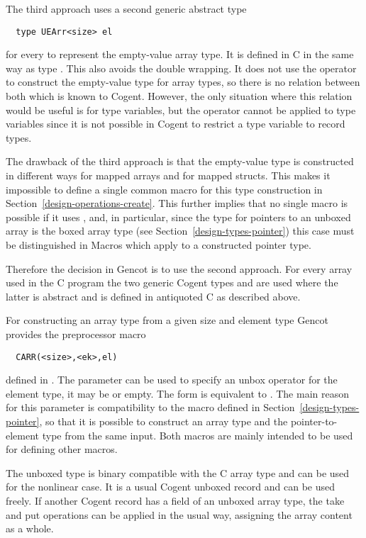 The third approach uses a second generic abstract type 
\begin{verbatim}
  type UEArr<size> el
\end{verbatim}
for every  to represent the empty-value array type. It is defined in C in the same way as type .
This also avoids the double wrapping. It does not use the  operator to construct the empty-value type
for array types, so there is no relation between both which is known to Cogent. However, the only situation where this
relation would be useful is for type variables, but the  operator cannot be applied to type variables since
it is not possible in Cogent to restrict a type variable to record types. 

The drawback of the third approach is that the empty-value 
type is constructed in different ways for mapped arrays and for mapped structs. This makes it impossible to define 
a single common macro  for this type construction in Section~\ref{design-operations-create}. This further 
implies that no single macro is possible if it uses , and, in particular, since the type for pointers to
an unboxed array is the boxed array type (see Section~\ref{design-types-pointer}) this case must be distinguished 
in Macros which apply  to a constructed pointer type.

Therefore the decision in Gencot is to use the second approach. For every array  used in the C 
program the two generic Cogent types  and  are used where the latter is
abstract and is defined in antiquoted C as described above.

For constructing an array type from a given size and element type Gencot provides the preprocessor macro
\begin{verbatim}
  CARR(<size>,<ek>,el)
\end{verbatim}
defined in . The parameter  can be used to specify an unbox
operator for the element type, it may be  or empty. The form  is equivalent
to . The main reason for this parameter is compatibility to the macro 
defined in Section~\ref{design-types-pointer}, so that it is possible to construct an array type and the 
pointer-to-element type from the same input. Both macros are mainly intended to be used for defining other
macros.

The unboxed type  is binary compatible with the C array type and can be used for
the nonlinear case. It is a usual Cogent unboxed record and can be used freely. 
If another Cogent record has a field of an unboxed array type, the take and put operations can be applied
in the usual way, assigning the array content as a whole.

